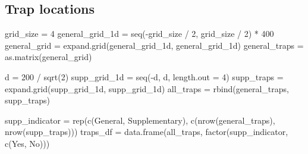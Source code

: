 \documentclass[
]{book}
\newenvironment{Shaded}{\begin{snugshade}}{\end{snugshade}}
\newcommand{\AttributeTok}[1]{\textcolor[rgb]{0.77,0.63,0.00}{#1}}
\newcommand{\DecValTok}[1]{\textcolor[rgb]{0.00,0.00,0.81}{#1}}
\newcommand{\FunctionTok}[1]{\textcolor[rgb]{0.00,0.00,0.00}{#1}}
\newcommand{\NormalTok}[1]{#1}
\newcommand{\OtherTok}[1]{\textcolor[rgb]{0.56,0.35,0.01}{#1}}
\newcommand{\SpecialCharTok}[1]{\textcolor[rgb]{0.00,0.00,0.00}{#1}}
\newcommand{\StringTok}[1]{\textcolor[rgb]{0.31,0.60,0.02}{#1}}
\begin{document}
\hypertarget{trap-locations}{%
\subsection{Trap locations}\label{trap-locations}}

\begin{Shaded}
\begin{Highlighting}[]
\NormalTok{grid\_size }\OtherTok{=} \DecValTok{4}
\NormalTok{general\_grid\_1d }\OtherTok{=} \FunctionTok{seq}\NormalTok{(}\SpecialCharTok{{-}}\NormalTok{grid\_size }\SpecialCharTok{/} \DecValTok{2}\NormalTok{, grid\_size }\SpecialCharTok{/} \DecValTok{2}\NormalTok{) }\SpecialCharTok{*} \DecValTok{400}
\NormalTok{general\_grid }\OtherTok{=} \FunctionTok{expand.grid}\NormalTok{(general\_grid\_1d, general\_grid\_1d)}
\NormalTok{general\_traps }\OtherTok{=} \FunctionTok{as.matrix}\NormalTok{(general\_grid)}

\NormalTok{d }\OtherTok{=} \DecValTok{200} \SpecialCharTok{/} \FunctionTok{sqrt}\NormalTok{(}\DecValTok{2}\NormalTok{)}
\NormalTok{supp\_grid\_1d }\OtherTok{=} \FunctionTok{seq}\NormalTok{(}\SpecialCharTok{{-}}\NormalTok{d, d, }\AttributeTok{length.out =} \DecValTok{4}\NormalTok{)}
\NormalTok{supp\_traps }\OtherTok{=} \FunctionTok{expand.grid}\NormalTok{(supp\_grid\_1d, supp\_grid\_1d)}
\NormalTok{all\_traps }\OtherTok{=} \FunctionTok{rbind}\NormalTok{(general\_traps, supp\_traps)}

\NormalTok{supp\_indicator }\OtherTok{=} \FunctionTok{rep}\NormalTok{(}\FunctionTok{c}\NormalTok{(}\StringTok{\textquotesingle{}General\textquotesingle{}}\NormalTok{, }\StringTok{\textquotesingle{}Supplementary\textquotesingle{}}\NormalTok{), }\FunctionTok{c}\NormalTok{(}\FunctionTok{nrow}\NormalTok{(general\_traps), }\FunctionTok{nrow}\NormalTok{(supp\_traps)))}
\NormalTok{traps\_df }\OtherTok{=} \FunctionTok{data.frame}\NormalTok{(all\_traps, }\FunctionTok{factor}\NormalTok{(supp\_indicator, }\FunctionTok{c}\NormalTok{(}\StringTok{\textquotesingle{}Yes\textquotesingle{}}\NormalTok{, }\StringTok{\textquotesingle{}No\textquotesingle{}}\NormalTok{)))}


\end{Highlighting}
\end{Shaded}
\end{document}
